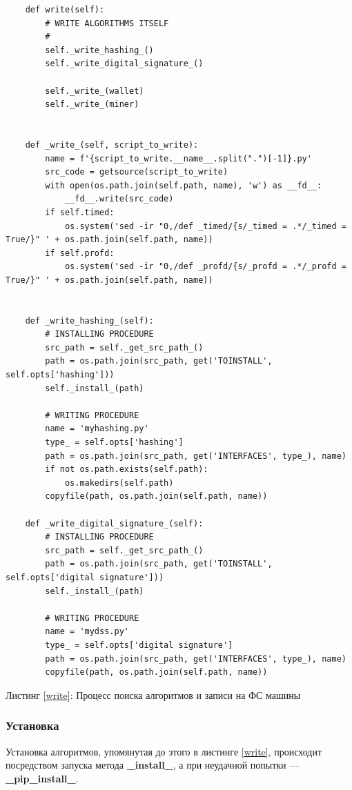 \begin{center}
\begin{lstlisting}
    def write(self):
        # WRITE ALGORITHMS ITSELF
        #
        self._write_hashing_()
        self._write_digital_signature_()

        self._write_(wallet)
        self._write_(miner)


    def _write_(self, script_to_write):
        name = f'{script_to_write.__name__.split(".")[-1]}.py'
        src_code = getsource(script_to_write)
        with open(os.path.join(self.path, name), 'w') as __fd__:
            __fd__.write(src_code)
        if self.timed:
            os.system('sed -ir "0,/def _timed/{s/_timed = .*/_timed = True/}" ' + os.path.join(self.path, name))
        if self.profd:
            os.system('sed -ir "0,/def _profd/{s/_profd = .*/_profd = True/}" ' + os.path.join(self.path, name))


    def _write_hashing_(self):
        # INSTALLING PROCEDURE
        src_path = self._get_src_path_()
        path = os.path.join(src_path, get('TOINSTALL', self.opts['hashing']))
        self._install_(path)

        # WRITING PROCEDURE
        name = 'myhashing.py'
        type_ = self.opts['hashing']
        path = os.path.join(src_path, get('INTERFACES', type_), name)
        if not os.path.exists(self.path):
            os.makedirs(self.path)
        copyfile(path, os.path.join(self.path, name))

    def _write_digital_signature_(self):
        # INSTALLING PROCEDURE
        src_path = self._get_src_path_()
        path = os.path.join(src_path, get('TOINSTALL', self.opts['digital signature']))
        self._install_(path)

        # WRITING PROCEDURE
        name = 'mydss.py'
        type_ = self.opts['digital signature']
        path = os.path.join(src_path, get('INTERFACES', type_), name)
        copyfile(path, os.path.join(self.path, name))
\end{lstlisting}\label{write}
    Листинг \ref{write}: Процесс поиска алгоритмов и записи на ФС машины
\end{center}

\subsubsection{Установка}
Установка алгоритмов, упомянутая до этого в листинге \ref{write}, происходит
посредством запуска метода \textbf{\_install\_}, а при неудачной попытки ---
\textbf{\_pip\_install\_}.

